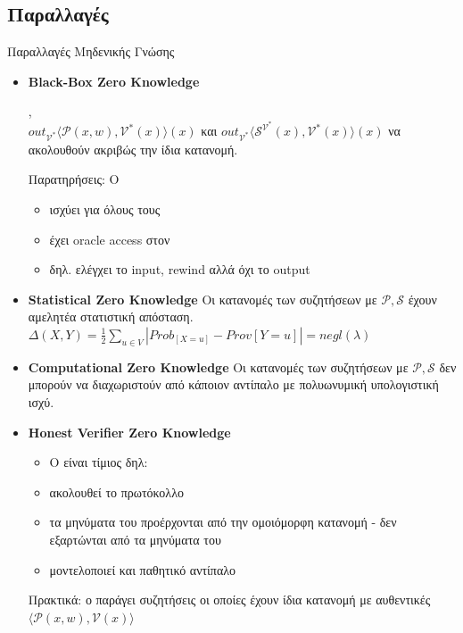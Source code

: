 \documentclass[handout]{beamer}
\begin{document}
\subsection{Παραλλαγές}
\begin{frame}[allowframebreaks]{Παραλλαγές Μηδενικής Γνώσης}
\begin{itemize}
	\item \textbf{Black-Box Zero Knowledge} 
	
	 ,   \\
	$ out_{\mathcal{V}^*} \langle \mathcal{P}(x,w), \mathcal{V}^*(x) \rangle (x) $ και $ out_{\mathcal{V}^*} \langle \mathcal{S}^{ \mathcal{V}^*}(x), \mathcal{V}^*(x) \rangle (x) $ να ακολουθούν ακριβώς την ίδια κατανομή.
	
	Παρατηρήσεις: O \siml 
	\begin{itemize}
	    \item ισχύει για όλους τους \ver
	    \item έχει oracle access στον \ver
	    \item δηλ. ελέγχει το input, rewind αλλά όχι το output 
	\end{itemize}
	
	\framebreak
	
	\item \textbf{Statistical Zero Knowledge} Οι κατανομές των συζητήσεων με $\mathcal{P},\mathcal{S}$ έχουν αμελητέα στατιστική απόσταση. 
	$\Delta(X,Y) = \frac{1}{2} \sum_{u \in V}|Prob_[X=u] - Prov[Y=u]|=negl(\lambda)$
	
 	\item \textbf{Computational Zero Knowledge} Οι κατανομές των συζητήσεων με $\mathcal{P},\mathcal{S}$  δεν μπορούν να διαχωριστούν από κάποιον αντίπαλο με πολυωνυμική υπολογιστική ισχύ.
 	
	\framebreak
	
	\item \textbf{Honest Verifier Zero Knowledge}
	\begin{itemize}
	\item Ο \ver  είναι τίμιος δηλ:
	\item ακολουθεί το πρωτόκολλο
	\item τα μηνύματα του προέρχονται από την ομοιόμορφη κατανομή - δεν εξαρτώνται από τα μηνύματα του \prv 
	\item μοντελοποιεί και παθητικό αντίπαλο
	\end{itemize}	  
	Πρακτικά: ο \siml παράγει συζητήσεις οι οποίες έχουν ίδια κατανομή με αυθεντικές $\langle \mathcal{P}(x,w), \mathcal{V}(x) \rangle$ 
\end{itemize}

\end{frame}
\end{document}
